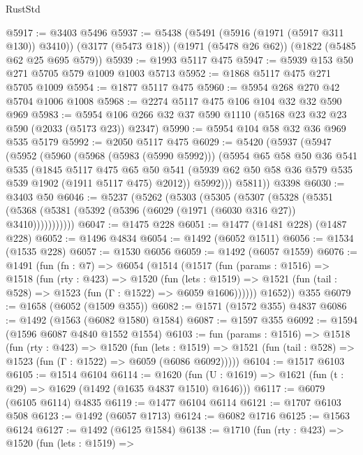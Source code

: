 \begin{lexlean}{RustStd}
\begin{coremodule}
{\begin{coremodule}
{{{{{{{{{{{{{@5917 := @3403 @5496
@5937 := @5438
    (@5491 (@5916 (@1971 (@5917 @311 @130)) @3410))
    (@3177 (@5473 @18))
    (@1971 (@5478 @26 @62))
    (@1822 (@5485 @62 @25 @695 @579))
@5939 := @1993 @5117 @475
@5947 := @5939 @153 @50 @271 @5705 @579 @1009 @1003 @5713
@5952 := @1868 @5117 @475 @271 @5705 @1009
@5954 := @1877 @5117 @475
@5960 := @5954 @268 @270 @42 @5704 @1006 @1008
@5968 := @2274 @5117 @475 @106 @104 @32 @32 @590 @969
@5983 := @5954 @106 @266 @32 @37 @590 @1110 (@5168 @23 @32 @23 @590 (@2033 (@5173 @23)) @2347)
@5990 := @5954 @104 @58 @32 @36 @969 @535 @5179
@5992 := @2050 @5117 @475
@6029 := @5420
    (@5937
      (@5947
        (@5952
          (@5960
            (@5968 (@5983 (@5990 @5992)))
            (@5954
              @65
              @58
              @50
              @36
              @541
              @535
              (@1845
                @5117
                @475
                @65
                @50
                @541
                (@5939 @62 @50 @58 @36 @579 @535 @539 @1902 (@1911 @5117 @475) @2012))
              @5992)))
        @5811))
    @3398
@6030 := @3403 @50
@6046 := @5237
    (@5262
      (@5303
        (@5305
          (@5307
            (@5328
              (@5351 (@5368 (@5381 (@5392 (@5396 (@6029 (@1971 (@6030 @316 @27)) @3410)))))))))))
@6047 := @1475 @228
@6051 := @1477 (@1481 @228) (@1487 @228)
@6052 := @1496 @4834
@6054 := @1492 (@6052 @1511)
@6056 := @1534 (@1535 @228)
@6057 := @1530 @6056
@6059 := @1492 (@6057 @1559)
@6076 := @1491
    (fun (fn : @7) =>
    @6054
      (@1514
        (@1517
          (fun (params : @1516) =>
          @1518
            (fun (rty : @423) =>
            @1520
              (fun (lets : @1519) =>
              @1521 (fun (tail : @528) => @1523 (fun (Γ : @1522) => @6059 @1606))))))
        @1652))
    @355
@6079 := @1658 (@6052 (@1509 @355))
@6082 := @1571 (@1572 @355) @4837
@6086 := @1492 (@1563 (@6082 @1580) @1584)
@6087 := @1597 @355
@6092 := @1594 (@1596 @6087 @4840 @1552 @1554)
@6103 := fun (params : @1516) =>
  @1518
    (fun (rty : @423) =>
    @1520
      (fun (lets : @1519) =>
      @1521 (fun (tail : @528) => @1523 (fun (Γ : @1522) => @6059 (@6086 @6092)))))
@6104 := @1517 @6103
@6105 := @1514 @6104
@6114 := @1620 (fun (U : @1619) => @1621 (fun (t : @29) => @1629 (@1492 (@1635 @4837 @1510) @1646)))
@6117 := @6079 (@6105 @6114) @4835
@6119 := @1477 @6104 @6114
@6121 := @1707 @6103 @508
@6123 := @1492 (@6057 @1713)
@6124 := @6082 @1716
@6125 := @1563 @6124
@6127 := @1492 (@6125 @1584)
@6138 := @1710
    (fun (rty : @423) =>
    @1520
      (fun (lets : @1519) =>
}}}}}}}}}}}}}
\end{coremodule}}
\end{coremodule}
\end{lexlean}
